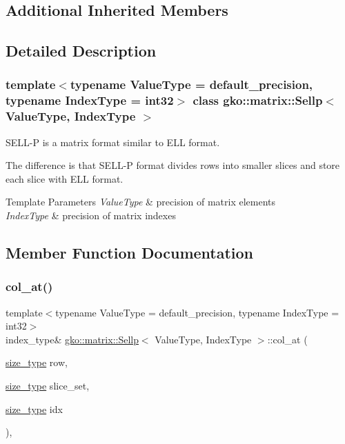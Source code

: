 \subsection*{Additional Inherited Members}


\subsection{Detailed Description}
\subsubsection*{template$<$typename Value\+Type = default\+\_\+precision, typename Index\+Type = int32$>$\newline
class gko\+::matrix\+::\+Sellp$<$ Value\+Type, Index\+Type $>$}

S\+E\+L\+L-\/P is a matrix format similar to E\+LL format. 

The difference is that S\+E\+L\+L-\/P format divides rows into smaller slices and store each slice with E\+LL format.


\begin{DoxyTemplParams}{Template Parameters}
{\em Value\+Type} & precision of matrix elements \\
\hline
{\em Index\+Type} & precision of matrix indexes \\
\hline
\end{DoxyTemplParams}


\subsection{Member Function Documentation}
\mbox{\label{classgko_1_1matrix_1_1Sellp_a994af14832dbc9ff70e431f6c11a1d52}} 
\subsubsection{\texorpdfstring{col\+\_\+at()}{col\_at()}\hspace{0.1cm}{\footnotesize\ttfamily [1/2]}}
{\footnotesize\ttfamily template$<$typename Value\+Type = default\+\_\+precision, typename Index\+Type = int32$>$ \\
index\+\_\+type\& \hyperlink{classgko_1_1matrix_1_1Sellp}{gko\+::matrix\+::\+Sellp}$<$ Value\+Type, Index\+Type $>$\+::col\+\_\+at (\begin{DoxyParamCaption}\item[{\hyperlink{namespacegko_a6e5c95df0ae4e47aab2f604a22d98ee7}{size\+\_\+type}}]{row,  }\item[{\hyperlink{namespacegko_a6e5c95df0ae4e47aab2f604a22d98ee7}{size\+\_\+type}}]{slice\+\_\+set,  }\item[{\hyperlink{namespacegko_a6e5c95df0ae4e47aab2f604a22d98ee7}{size\+\_\+type}}]{idx }\end{DoxyParamCaption})\hspace{0.3cm}{\ttfamily [inline]}, {\ttfamily [noexcept]}}



